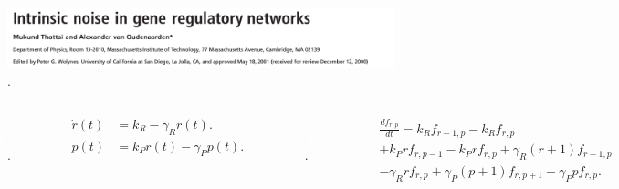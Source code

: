 \documentclass{beamer}
\begin{document}
\begin{frame}
\begin{figure}[p]
    \centering
    \includegraphics[width=1\textwidth]{title.png}\\
    \tiny \cite{thattai01}.
\end{figure}
\begin{columns}[c]


\begin{figure}[p]
    \centering
    \includegraphics[width=0.5\textwidth]{expressionsimple.png}\\
    \tiny \cite{thattai01}.
\end{figure}
\begin{align*}
\dot{r}(t) &= k_R - \gamma_Rr(t).\\
\dot{p}(t) &= k_Pr(t) - \gamma_Pp(t).
\end{align*}
\begin{figure}[p]
    \centering
    \includegraphics[width=0.4\textwidth]{scheme1.png}\\
    \tiny \cite{thattai01}.
\end{figure}
\begin{align*}
&\frac{d{f}_{r,p}}{dt} = k_Rf_{r-1,p} - k_Rf_{r,p}\\
&+ k_Prf_{r,p-1} - k_Prf_{r,p} + \gamma_R(r+1)f_{r+1,p}\\
&- \gamma_Rrf_{r,p} + \gamma_P(p+1)f_{r,p+1} - \gamma_Ppf_{r,p}.
\end{align*}
\end{columns}
\end{frame}
\end{document}
